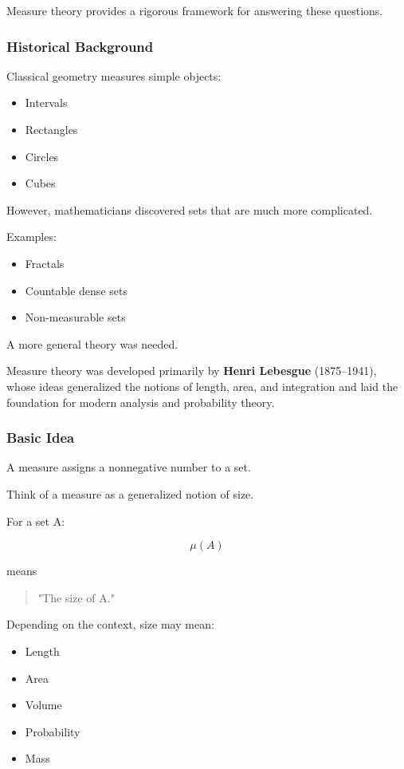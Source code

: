 \documentclass[11pt]{article}
\begin{document}
Measure theory provides a rigorous framework for answering these questions.
\subsubsection{Historical Background}
\label{sec:org9a4394a}

Classical geometry measures simple objects:

\begin{itemize}
\item Intervals
\item Rectangles
\item Circles
\item Cubes
\end{itemize}

However, mathematicians discovered sets that are much more complicated.

Examples:

\begin{itemize}
\item Fractals
\item Countable dense sets
\item Non-measurable sets
\end{itemize}

A more general theory was needed.

Measure theory was developed primarily by \textbf{Henri Lebesgue} (1875–1941), whose ideas generalized the notions of length, area, and integration and laid the foundation for modern analysis and probability theory.
\subsubsection{Basic Idea}
\label{sec:org2d76469}

A measure assigns a nonnegative number to a set.

Think of a measure as a generalized notion of size.

For a set A:

\[
\mu(A)
\]

means

\begin{quote}
"The size of A."
\end{quote}

Depending on the context, size may mean:

\begin{itemize}
\item Length
\item Area
\item Volume
\item Probability
\item Mass
\end{itemize}
\end{document}
